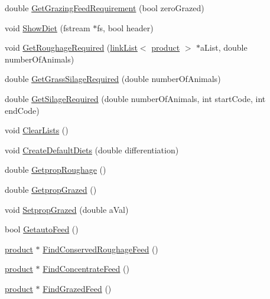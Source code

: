 \begin{DoxyCompactItemize}
\item 
double \hyperlink{classdiet_a138e712affb55216103df24b015ab279}{GetGrazingFeedRequirement} (bool zeroGrazed)
\item 
void \hyperlink{classdiet_ae1dd65fbcf12c6f7f2c576896935e293}{ShowDiet} (fstream $\ast$fs, bool header)
\item 
void \hyperlink{classdiet_a6745f2d95c6f4c86857f4490086112bd}{GetRoughageRequired} (\hyperlink{classlink_list}{linkList}$<$ \hyperlink{classproduct}{product} $>$ $\ast$aList, double numberOfAnimals)
\item 
double \hyperlink{classdiet_a78d45d92896f9dffca096c03809338be}{GetGrassSilageRequired} (double numberOfAnimals)
\item 
double \hyperlink{classdiet_ae87ac77e21a845e5ea1d671a85703761}{GetSilageRequired} (double numberOfAnimals, int startCode, int endCode)
\item 
void \hyperlink{classdiet_a2232697991c7292a66bf920eacd8f8de}{ClearLists} ()
\item 
void \hyperlink{classdiet_a8444b527fbd89b0c61ebff4413d53516}{CreateDefaultDiets} (double differentiation)
\item 
double \hyperlink{classdiet_a90e75f05792ef5fe58c8a18be70af856}{GetpropRoughage} ()
\item 
double \hyperlink{classdiet_a6673b1f0e3b2b033b73c16a7e096ee87}{GetpropGrazed} ()
\item 
void \hyperlink{classdiet_a0abc110d56e3c840390ebee47106edf9}{SetpropGrazed} (double aVal)
\item 
bool \hyperlink{classdiet_a6c9fcde70c834198f2f67b361b93313b}{GetautoFeed} ()
\item 
\hyperlink{classproduct}{product} $\ast$ \hyperlink{classdiet_ade50672d858563540e1589b857c6d4fb}{FindConservedRoughageFeed} ()
\item 
\hyperlink{classproduct}{product} $\ast$ \hyperlink{classdiet_a4ea8bc5fea836aedba836343ab6b5376}{FindConcentrateFeed} ()
\item 
\hyperlink{classproduct}{product} $\ast$ \hyperlink{classdiet_af057336f6bb49b8d919fcf4d9379d584}{FindGrazedFeed} ()
\end{DoxyCompactItemize}


